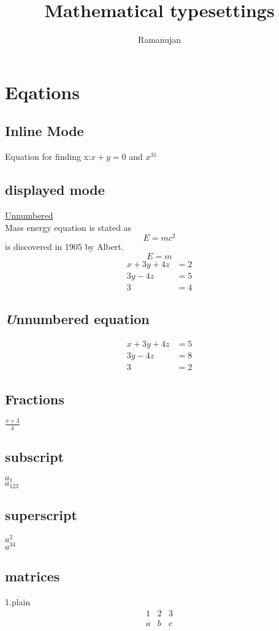 \documentclass[12pt,openany]{book}
\begin{document}
\title{Mathematical typesettings}
\author{Ramanujan}
\maketitle
\chapter{Eqations}
\section{Inline Mode}
Equation for finding x:$ x+y=0 $ and $ x^{31} $ 

\section{displayed mode}
\underline{Unnumbered}\\
Mass energy equation is stated as $$E=mc^2$$ is discovered in 1905 by Albert.
\begin{equation}
E=m
\end{equation}
\begin{align}
x+3y+4z&=2\\
3y-4z&=5\\
3&=4
\end{align}
\section{\textbf{\textit Unnumbered equation}}
\begin{align*}
x+3y+4z&=5\\
3y-4z&=8\\
3&=2
\end{align*}
\section{Fractions}
$ \frac{x+3}{4} $
\section{subscript} 
$ a_1 $ \\
$ a_{123} $ 
\section{superscript}
$ a^2 $ \\
$ a^{34} $

\section{matrices}
1.plain
$$
\begin{matrix}
1 & 2 & 3 \\
a & b & c
\end{matrix}
$$
\end{document}
